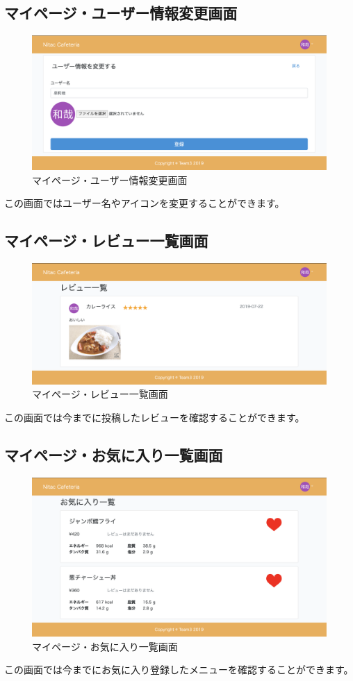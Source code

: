 \documentclass[a4paper]{jsarticle}
\begin{document}
\subsection{マイページ・ユーザー情報変更画面}
\begin{figure}[htbp]
	\centering
	\caption{マイページ・ユーザー情報変更画面}
	\includegraphics[scale = 0.225]{image/edit_user.png}
\end{figure}
この画面ではユーザー名やアイコンを変更することができます。
\subsection{マイページ・レビュー一覧画面}
\begin{figure}[htbp]
\centering
	\caption{マイページ・レビュー一覧画面}
	\includegraphics[scale = 0.225]{image/myreview.png}
\end{figure}
この画面では今までに投稿したレビューを確認することができます。
\newpage
\subsection{マイページ・お気に入り一覧画面}
\begin{figure}[htbp]
\centering
	\caption{マイページ・お気に入り一覧画面}
	\includegraphics[scale = 0.225]{image/myfavorite.png}
\end{figure}
この画面では今までにお気に入り登録したメニューを確認することができます。
\newpage
\end{document}
